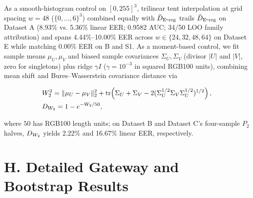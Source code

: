As a smooth-histogram control on $[0,255]^3$, trilinear tent interpolation at grid spacing $w=48$ ($\{0,\ldots,6\}^3$) combined equally with $\tilde D_{\mathrm{E\mbox{-}reg}}{}$ trails $\tilde D_{\mathrm{E\mbox{-}reg}}{}$ on Dataset A (8.93\% vs. 5.36\% linear EER; 0.9582 AUC; 34/50 LOO family attribution) and spans 4.44\%--10.00\% EER across $w\in\{24,32,48,64\}$ on Dataset E while matching 0.00\% EER on B and S1. As a moment-based control, we fit sample means $\mu_U,\mu_V$ and biased sample covariances $\Sigma_U,\Sigma_V$ (divisor $|U|$ and $|V|$, zero for singletons) plus ridge $\gamma I$ ($\gamma=10^{-3}$ in squared RGB100 units), combining mean shift and Bures--Wasserstein covariance distance \cite{ref29} via


\[
\begin{aligned} &W_2^2=\|\mu_U-\mu_V\|_2^2+\operatorname{tr}\!\left(\Sigma_U+\Sigma_V-2(\Sigma_U^{1/2}\Sigma_V\Sigma_U^{1/2})^{1/2}\right), \\ &D_{W_2}{}=1-e^{-W_2/50},\end{aligned}
\]

where $50$ has RGB100 length units; on Dataset B and Dataset C's four-sample $P_2$ halves, $D_{W_2}{}$ yields 2.22\% and 16.67\% linear EER, respectively.


\section*{H. Detailed Gateway and Bootstrap Results}

